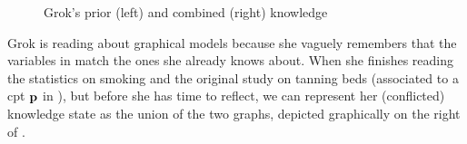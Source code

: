 \documentclass{article}
\numberwithin{equation}{section}
\begin{document}
\begin{example}
\begin{figure}
{
			}
			
			\caption{\small Grok's prior (left) and combined (right) knowledge}
			\label{fig:grok-combine}
		\end{figure}
		
		Grok is reading about graphical models because she
                vaguely remembers that the variables in
                 match the ones she already knows
                about. When she finishes reading the statistics on
                smoking and the original study on tanning beds
                (associated to a cpt $\mathbf p$ in ),
                but before she has time to reflect, we can represent
                her (conflicted) knowledge state as the union of the
                two graphs, depicted graphically on the right of
                .  
	 

\end{example}
\end{document}
